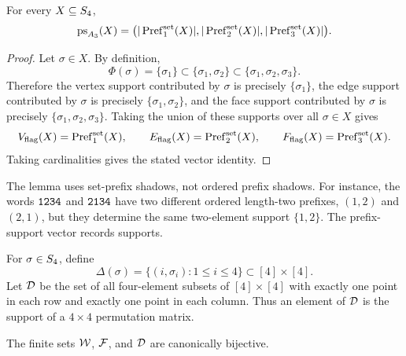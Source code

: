 \begin{lemma}
\label{lem:prefix-support-dictionary}
For every \(X\subseteq S_4\),
\[
  \operatorname{ps}_{A_3}(X)=\bigl(|\operatorname{Pref}_1^{\mathrm{set}}(X)|,|\operatorname{Pref}_2^{\mathrm{set}}(X)|,|\operatorname{Pref}_3^{\mathrm{set}}(X)|\bigr).
\]
\end{lemma}

\begin{proof}
Let \(\sigma\in X\). By definition,
\[
  \Phi(\sigma)=\{\sigma_1\}\subset \{\sigma_1,\sigma_2\}\subset
  \{\sigma_1,\sigma_2,\sigma_3\}.
\]
Therefore the vertex support contributed by \(\sigma\) is precisely \(\{\sigma_1\}\), the edge support contributed by \(\sigma\) is precisely \(\{\sigma_1,\sigma_2\}\), and the face support contributed by \(\sigma\) is precisely \(\{\sigma_1,\sigma_2,\sigma_3\}\). Taking the union of these supports over all \(\sigma\in X\) gives
\[
  V_{\mathrm{flag}}(X)=\operatorname{Pref}_1^{\mathrm{set}}(X),\qquad
  E_{\mathrm{flag}}(X)=\operatorname{Pref}_2^{\mathrm{set}}(X),\qquad
  F_{\mathrm{flag}}(X)=\operatorname{Pref}_3^{\mathrm{set}}(X).
\]
Taking cardinalities gives the stated vector identity.
\end{proof}

\begin{remark}
\label{rem:ordered-versus-set-prefix}
The lemma uses set-prefix shadows, not ordered prefix shadows. For instance, the words \(\texttt{1234}\) and \(\texttt{2134}\) have two different ordered length-two prefixes, \((1,2)\) and \((2,1)\), but they determine the same two-element support \(\{1,2\}\). The prefix-support vector records supports.
\end{remark}

\begin{definition}
\label{def:permutation-matrix-support}
For \(\sigma\in S_4\), define
\[
  \Delta(\sigma)=\{(i,\sigma_i):1\le i\le4\}\subset [4]\times[4].
\]
Let \(\mathcal D\) be the set of all four-element subsets of \([4]\times[4]\) with exactly one point in each row and exactly one point in each column. Thus an element of \(\mathcal D\) is the support of a \(4\times4\) permutation matrix.
\end{definition}

\begin{theorem}
\label{thm:s4-indexing-bridge}
The finite sets \(\mathcal W\), \(\mathcal F\), and \(\mathcal D\) are canonically bijective.
\end{theorem}

